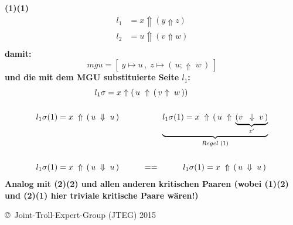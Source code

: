 \documentclass{article}
\begin{document}
		\textbf{(1)(1)}
			\begin{align*}
				l_1 &= x \Uparrow ( y \Uparrow z)  \\
				l_2 &= u \Uparrow ( v \Uparrow w)  \\
			\end{align*}
		\textbf{damit:}
			\[
				mgu = [\;y \mapsto u\,,\;z \mapsto (\,u;\Uparrow\;w\,)\;]
			\]
		\textbf{und die mit dem MGU substituierte Seite $l_1$:}\\
			\begin{align*}
				l_1\sigma = x \Uparrow (\,u\;&\Uparrow\,(\,v\Uparrow\;w\,))\\ \\
				l_1\sigma (1) = x\;\Uparrow \, ( \, u \; \Downarrow \; u\,)
				\hspace{1cm}&\hspace{8mm}
				\underbrace{l_1\sigma (1) = x\;\Uparrow \, ( \, u \; \Uparrow \,\underbrace{(v\;\;\Downarrow\;v\,)}_{z'}}_{Regel\;(1)} \\\\
				l_1\sigma (1) = x\;\Uparrow \, ( \, u \; \Downarrow \; u\,)
				\hspace{1cm}&==\hspace{10mm}			
				l_1\sigma (1) = x\;\Uparrow \, ( \, u \; \Downarrow \; u\,) \\
			\end{align*}
		\textbf{Analog mit (2)(2) und allen anderen kritischen Paaren (wobei (1)(2) und (2)(1) hier triviale kritische Paare w\"aren!)}
		
		
		
		
		
		
		
		
		
	
		
		
		
	\begin{tiny}
	\copyright\ Joint-Troll-Expert-Group (JTEG) 2015
	\end{tiny}
\end{document}
